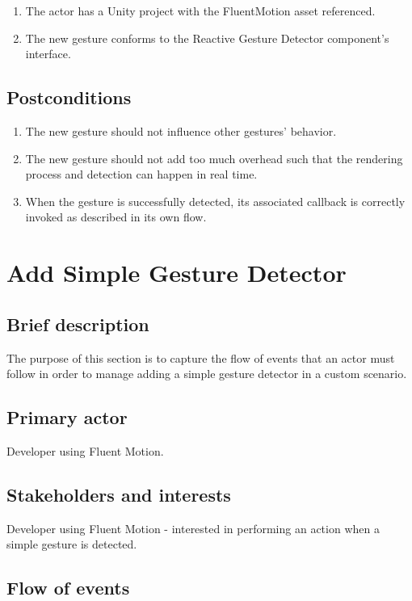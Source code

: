 \documentclass[12pt,a4paper,twoside]{report}
\begin{document}
\begin{enumerate}
  \item The actor has a Unity project with the FluentMotion asset referenced.
  \item The new gesture conforms to the Reactive Gesture Detector component's interface.
\end{enumerate}

\subsection{Postconditions}

\begin{enumerate}
  \item The new gesture should not influence other gestures’ behavior.
  \item The new gesture should not add too much overhead such that the rendering process and detection can happen in real time.
  \item When the gesture is successfully detected, its associated callback is correctly invoked as described in its own flow.
\end{enumerate}

\section{Add Simple Gesture Detector}

\subsection{Brief description}
The purpose of this section is to capture the flow of events that an actor must follow in order to manage adding a simple gesture detector in a custom scenario.

\subsection{Primary actor}
Developer using Fluent Motion.

\subsection{Stakeholders and interests}
Developer using Fluent Motion - interested in performing an action when a simple gesture is detected.

\subsection{Flow of events}
\end{document}
